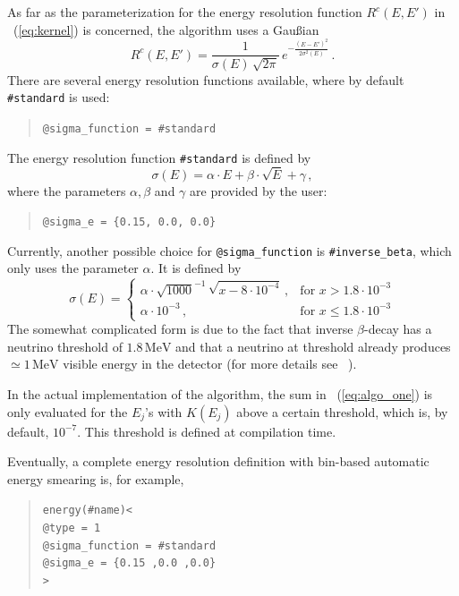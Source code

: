 %
As far as the parameterization for the energy resolution function 
$R^c(E,E')$ in \eq~(\ref{eq:kernel}) is concerned, the algorithm uses
a Gau\ss ian
\begin{equation}
R^c(E,E')=\frac{1}{\sigma(E)\,\sqrt{2\pi}}\,e^{-\frac{(E-E')^2}{2\sigma^2(E)}} \, .
\end{equation} 
%
%
There are several energy resolution functions available, where by default
{\tt \#standard} is used:
\begin{quote}
{\tt \tb @sigma\_function = \#standard} 
\end{quote}
%
%
The energy resolution function {\tt \#standard} is defined by
\begin{equation}
\label{eq:sigma_e}
\sigma(E)=\alpha\cdot E + \beta \cdot \sqrt{E} +\gamma\, ,
\end{equation}
where the parameters $\alpha, \beta$ and $\gamma$ are provided by the user:
\begin{quote}
{\tt \tb @sigma\_e = \{0.15, 0.0, 0.0\}}
\end{quote}
Currently, another possible choice for {\tt @sigma\_function} is {\tt \#inverse\_beta},
%
%
which only uses the parameter $\alpha$. It is defined by
\begin{equation}
\sigma(E)= \left\{\begin{array}{cl}
 \alpha \cdot \sqrt{1000}^{-1}\,\sqrt{x-8\cdot10^{-4}}\,,&\mathrm{for}\,\, 
x>1.8\cdot10^{-3}\\
\alpha\cdot10^{-3} \,,&\mathrm{for}\,\, x \leq 1.8\cdot10^{-3}
\end{array} \right.
\end{equation}
The somewhat complicated form is due to the fact that inverse $\beta$-decay
has a neutrino threshold of $1.8\,\mathrm{MeV}$ and that a neutrino
at threshold already produces $\simeq 1\,\mathrm{MeV}$ visible energy in
the detector (for more details see \eg~\cite{Huber:2003pm}). 

In the actual implementation of the algorithm,  the sum in \eq~(\ref{eq:algo_one}) is only evaluated
 for the $E_j$'s with $K(E_j)$ 
above a certain threshold, which is, by default, $10^{-7}$. 
This threshold is defined at compilation time. 

Eventually,  a complete energy resolution definition with bin-based
automatic energy smearing is, for example,
\begin{quote}
{\tt energy(\#name)<\\
\tb @type = 1\\
\tb @sigma\_function = \#standard\\
\tb @sigma\_e = \{0.15 ,0.0 ,0.0\}\\
>
}
\end{quote}

